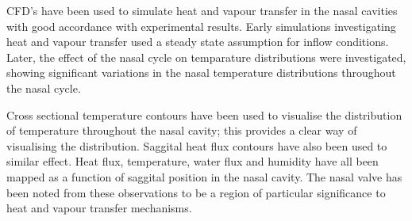 CFD's have been used to simulate heat and vapour transfer in the nasal cavities with good accordance with experimental results\cite{Lindemann2004}. Early simulations investigating heat and vapour transfer used a steady state assumption for inflow conditions\cite{Naftali1998}. Later, the effect of the nasal cycle on temparature distributions were investigated, showing significant variations in the nasal temperature distributions throughout the nasal cycle\cite{Elad2006}.

Cross sectional temperature contours have been used to visualise the distribution of temperature throughout the nasal cavity; this provides a clear way of visualising the distribution\cite{Naftali2005}. Saggital heat flux contours have also been used to similar effect\cite{Sullivan2013}. Heat flux, temperature, water flux and humidity have all been mapped as a function of saggital position in the nasal cavity\cite{Garcia2007, Sullivan2013, Yu2014}. The nasal valve has been noted from these observations to be a region of particular significance to heat and vapour transfer mechanisms\cite{Sullivan2013}. 




%
%
%
%
%
%
%
%
%
%
%
%
%
%
%
%
%
%


